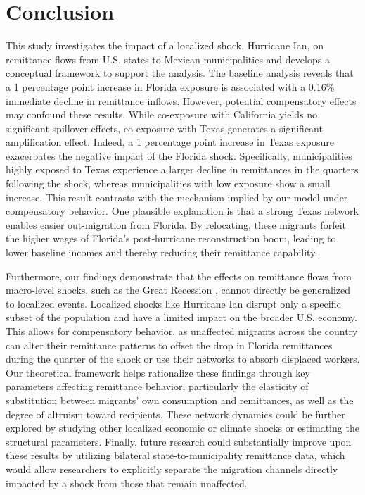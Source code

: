 \chapter{Conclusion}
This study investigates the impact of a localized shock, Hurricane Ian, on remittance flows from U.S. states to Mexican municipalities and develops a conceptual framework to support the analysis. The baseline analysis reveals that a 1 percentage point increase in Florida exposure is associated with a 0.16\% immediate decline in remittance inflows. However, potential compensatory effects may confound these results. While co-exposure with California yields no significant spillover effects, co-exposure with Texas generates a significant amplification effect. Indeed, a 1 percentage point increase in Texas exposure exacerbates the negative impact of the Florida shock. Specifically, municipalities highly exposed to Texas experience a larger decline in remittances in the quarters following the shock, whereas municipalities with low exposure show a small increase. This result contrasts with the mechanism implied by our model under compensatory behavior. One plausible explanation is that a strong Texas network enables easier out-migration from Florida. By relocating, these migrants forfeit the higher wages of Florida's post-hurricane reconstruction boom, leading to lower baseline incomes and thereby reducing their remittance capability. 
\par
Furthermore, our findings demonstrate that the effects on remittance flows from macro-level shocks, such as the Great Recession \parencite{caballero_2023}, cannot directly be generalized to localized events. Localized shocks like Hurricane Ian disrupt only a specific subset of the population and have a limited impact on the broader U.S. economy. This allows for compensatory behavior, as unaffected migrants across the country can alter their remittance patterns to offset the drop in Florida remittances during the quarter of the shock or use their networks to absorb displaced workers. Our theoretical framework helps rationalize these findings through key parameters affecting remittance behavior, particularly the elasticity of substitution between migrants' own consumption and remittances, as well as the degree of altruism toward recipients. These network dynamics could be further explored by studying other localized economic or climate shocks or estimating the structural parameters. Finally, future research could substantially improve upon these results by utilizing bilateral state-to-municipality remittance data, which would allow researchers to explicitly separate the migration channels directly impacted by a shock from those that remain unaffected. 

